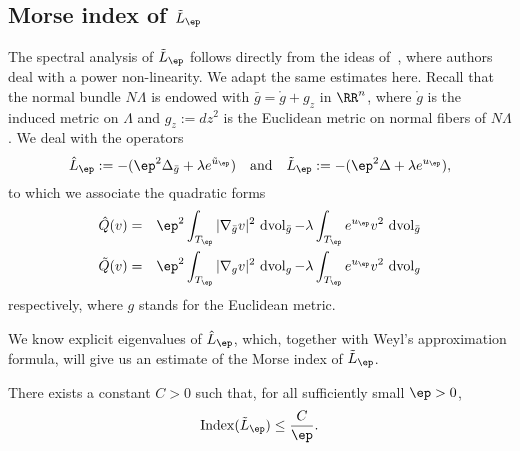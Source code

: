 
\subsection{Morse index of $\tilde L_\ep$}

The spectral analysis of $\tilde L_\ep$ follows directly from the ideas
of~\cite{Pacard2014}, where authors deal with a power non-linearity. We adapt
the same estimates here. Recall that the normal bundle $N\Lambda$ is endowed
with $\bar g= \mathring g + g_z$ in $\RR^n$, where $\mathring g$ is the induced
metric on $\Lambda$ and $g_z:=dz^2$ is the Euclidean metric on normal fibers of
$N\Lambda$. We deal with the operators
\[
    \hat L_\ep:=-(\ep^2\Delta_{\bar g}+\lambda e^{\tilde u_\ep}) \quad \mbox{and}
    \quad \tilde L_\ep := -(\ep^2\Delta + \lambda e^{u_\ep}),
\]
to which we associate the quadratic forms
\begin{eqnarray*}
    \hat Q(v) &=& \ep^2 \int_{T_\ep}|\nabla_{\bar g} v|^2\, \operatorname{dvol}_{\bar g}
    - \lambda \int_{T_\ep}e^{u_\ep}v^2 \, \operatorname{dvol}_{\bar g}\\
    \tilde Q(v) &=& \ep^2 \int_{T_\ep}|\nabla_{g} v|^2\, \operatorname{dvol}_{g}
    - \lambda \int_{T_\ep}e^{u_\ep}v^2 \, \operatorname{dvol}_{g}\\
\end{eqnarray*}
respectively, where $g$ stands for the Euclidean metric.

We know explicit eigenvalues of $\hat L_\ep$, which, together with Weyl's
approximation formula, will give us an estimate of the Morse index of
$\tilde L_\ep$.

\begin{lemma}
    There exists a constant $C>0$ such that, for all sufficiently small $\ep>0$,
    \[
        \operatorname{Index}(\tilde L_\ep)\leq \frac{C}{\ep}.
    \]
\end{lemma}

